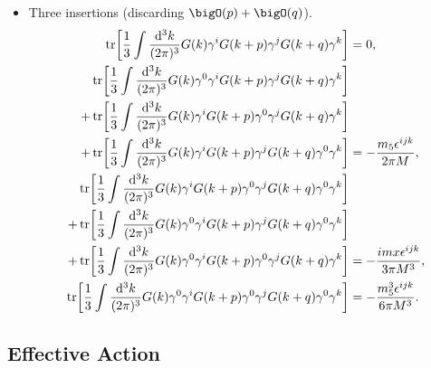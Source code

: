 \documentclass{article}
\begin{document}
\begin{itemize}
    \item Three insertions (discarding $\bigO(p)+\bigO(q)$).
    \begin{align*}
        \tr[\frac{1}{3} \int \frac{\dd[3]{k}}{(2\pi)^3} G(k) \gamma^i G(k+p)\gamma^j G(k+q) \gamma^k] &= 0, \\
        \tr[\frac{1}{3} \int \frac{\dd[3]{k}}{(2\pi)^3} G(k)\gamma^0 \gamma^i G(k+p)\gamma^j G(k+q) \gamma^k] & \\
        +\tr[\frac{1}{3} \int \frac{\dd[3]{k}}{(2\pi)^3} G(k)\gamma^i G(k+p)\gamma^0 \gamma^j G(k+q) \gamma^k] & \\
        +\tr[\frac{1}{3} \int \frac{\dd[3]{k}}{(2\pi)^3} G(k)\gamma^i G(k+p)\gamma^j G(k+q) \gamma^0 \gamma^k] &= -\frac{m_5 \epsilon^{ijk}}{2\pi M}, \\
        \tr[\frac{1}{3} \int \frac{\dd[3]{k}}{(2\pi)^3} G(k)\gamma^i G(k+p)\gamma^0 \gamma^j G(k+q) \gamma^0 \gamma^k] & \\
        +\tr[\frac{1}{3} \int \frac{\dd[3]{k}}{(2\pi)^3} G(k)\gamma^0 \gamma^i G(k+p)\gamma^j G(k+q) \gamma^0 \gamma^k] & \\
        +\tr[\frac{1}{3} \int \frac{\dd[3]{k}}{(2\pi)^3} G(k)\gamma^0 \gamma^i G(k+p)\gamma^0 \gamma^j G(k+q) \gamma^k] &= -\frac{i m x \epsilon^{ijk}}{3\pi M^3}, \\
        \tr[\frac{1}{3} \int \frac{\dd[3]{k}}{(2\pi)^3} G(k)\gamma^0 \gamma^i G(k+p)\gamma^0 \gamma^j G(k+q)\gamma^0 \gamma^k] &= -\frac{m_5^3 \epsilon^{ijk}}{6\pi M^3}.
    \end{align*}
\end{itemize}

\subsection{Effective Action}


\end{document}
